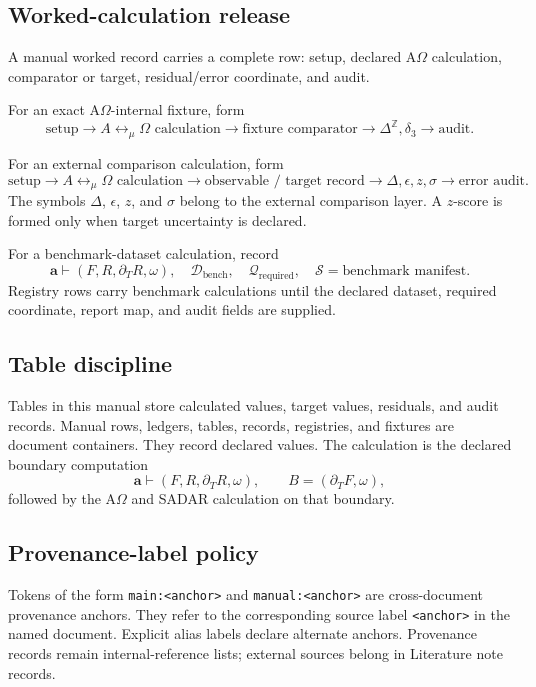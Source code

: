 \subsection{Worked-calculation release}\label{manual:worked-calculation-release}
A manual worked record carries a complete row: setup, declared A\(\Omega\) calculation, comparator or target, residual/error coordinate, and audit.

For an exact A\(\Omega\)-internal fixture, form
\[
\text{setup}
\to
A\leftrightarrow_{\mu}\Omega\text{ calculation}
\to
\text{fixture comparator}
\to
\Delta^{\mathbb Z},\delta_3
\to
\text{audit}.
\]

For an external comparison calculation, form
\[
\text{setup}
\to
A\leftrightarrow_{\mu}\Omega\text{ calculation}
\to
\text{observable / target record}
\to
\Delta,\epsilon,z,\sigma
\to
\text{error audit}.
\]
The symbols \(\Delta\), \(\epsilon\), \(z\), and \(\sigma\) belong to the external comparison layer. A \(z\)-score is formed only when target uncertainty is declared.

For a benchmark-dataset calculation, record
\[
\mathbf a\vdash(F,R,\partial_T R,\omega),\quad
\mathcal D_{\mathrm{bench}},\quad
\mathcal Q_{\mathrm{required}},\quad
\mathcal S=\text{benchmark manifest}.
\]
Registry rows carry benchmark calculations until the declared dataset, required coordinate, report map, and audit fields are supplied.


\subsection{Table discipline}\label{manual:table-discipline}
Tables in this manual store calculated values, target values, residuals, and audit records. Manual rows, ledgers, tables, records, registries, and fixtures are document containers. They record declared values. The calculation is the declared boundary computation
\[
\mathbf a\vdash(F,R,\partial_T R,\omega),
\qquad
B=(\partial_TF,\omega),
\]
followed by the A\(\Omega\) and SADAR calculation on that boundary.


\subsection{Provenance-label policy}\label{manual:provenance-label-policy}
Tokens of the form \texttt{main:<anchor>} and \texttt{manual:<anchor>} are cross-document provenance anchors. They refer to the corresponding source label \texttt{<anchor>} in the named document. Explicit alias labels declare alternate anchors. Provenance records remain internal-reference lists; external sources belong in Literature note records.

